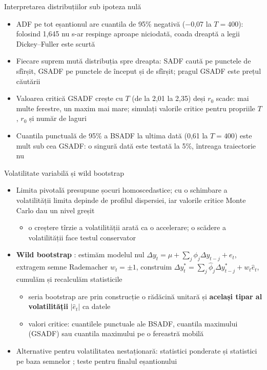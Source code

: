\begin{frame}{Interpretarea distribuțiilor sub ipoteza nulă}
\itemsize{\small}
\begin{itemize}
    \item ADF pe tot eșantionul are cuantila de 95\% negativă (\ensuremath{-}0{,}07 la $T = 400$): folosind 1,645 nu s-ar respinge aproape niciodată, coada dreaptă a legii Dickey--Fuller este scurtă
    \item Fiecare suprem mută distribuția spre dreapta: SADF caută pe punctele de sfîrșit, GSADF pe punctele de început și de sfîrșit; pragul GSADF este prețul căutării
    \item Valoarea critică GSADF crește cu $T$ (de la 2{,}01 la 2{,}35) deși $r_0$ scade: mai multe ferestre, un maxim mai mare; simulați valorile critice pentru propriile $T$, $r_0$ și număr de laguri
    \item Cuantila punctuală de 95\% a BSADF la ultima dată (0{,}61 la $T = 400$) este mult sub cea GSADF: o singură dată este testată la 5\%, întreaga traiectorie nu
\end{itemize}
\end{frame}

\begin{frame}{Volatilitate variabilă și wild bootstrap}
\itemsize{\small}
\begin{itemize}
    \item Limita pivotală presupune șocuri homoscedastice; cu o schimbare a volatilității limita depinde de profilul dispersiei, iar valorile critice Monte Carlo dau un nivel greșit 
    \begin{itemize}
        \item o creștere tîrzie a volatilității arată ca o accelerare; o scădere a volatilității face testul conservator
    \end{itemize}
    \item \textbf{Wild bootstrap} : estimăm modelul nul $\Delta y_t = \mu + \sum_j\phi_j\Delta y_{t-j} + e_t$, extragem semne Rademacher $w_t = \pm 1$, construim $\Delta y^*_t = \sum_j\hat\phi_j\Delta y^*_{t-j} + w_t\hat e_t$, cumulăm și recalculăm statisticile
    \begin{itemize}
        \item seria bootstrap are prin construcție o rădăcină unitară și \textbf{același tipar al volatilității} $|\hat e_t|$ ca datele
        \item valori critice: cuantilele punctuale ale BSADF, cuantila maximului (GSADF) sau cuantila maximului pe o fereastră mobilă
    \end{itemize}
    \item Alternative pentru volatilitatea nestaționară: statistici ponderate și statistici pe baza semnelor ; teste pentru finalul eșantionului 
\end{itemize}
\end{frame}

